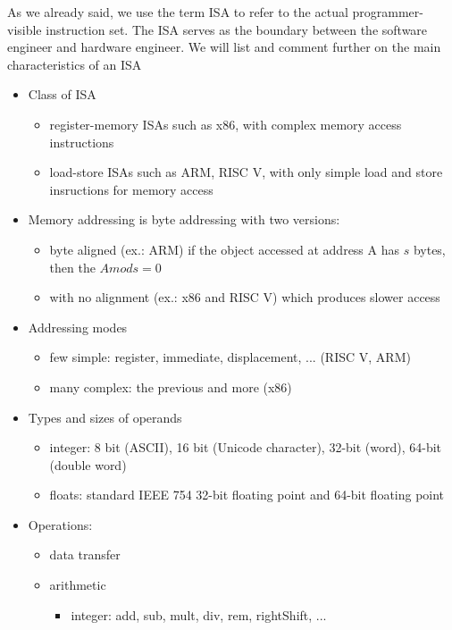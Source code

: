 As we already said, we use the term ISA to refer to the actual
programmer-visible instruction set. The ISA serves as the boundary
between the software engineer  and hardware engineer. We will list and comment further on the main characteristics of an ISA 
\begin{itemize}
    \item Class of ISA
        \begin{itemize}
            \item register-memory ISAs such as x86, with complex memory access instructions
            \item load-store ISAs such as ARM, RISC V, with only simple load and store insructions for memory access
        \end{itemize}
    \item Memory addressing is byte addressing with two versions:
        \begin{itemize}
            \item byte aligned (ex.: ARM) if the object accessed at address A has $s$ bytes, then the  $A mod s = 0$
            \item with no alignment (ex.: x86 and RISC V) which produces slower access
        \end{itemize}
    \item Addressing modes
        \begin{itemize}
            \item few simple: register, immediate, displacement, ... (RISC V, ARM)
            \item many complex: the previous and more (x86)
        \end{itemize}
    \item Types and sizes of operands
        \begin{itemize}
            \item integer: 8 bit (ASCII), 16 bit (Unicode character), 32-bit (word), 64-bit (double word)
            \item floats: standard IEEE 754 32-bit floating point and 64-bit floating point
        \end{itemize}
    \item Operations:
        \begin{itemize}
            \item data transfer
            \item arithmetic
                \begin{itemize}
                    \item integer: add, sub, mult, div, rem, rightShift, ...

\end{itemize}
\end{itemize}
\end{itemize}
